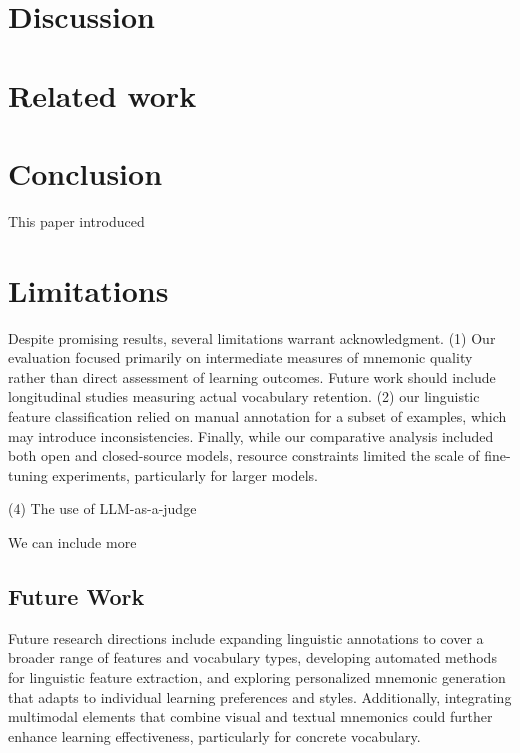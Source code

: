 \section{Discussion} \label{sec:discussion}


\section{Related work} \label{sec:related-work}


\section{Conclusion} \label{sec:conclusion}
This paper introduced

\section{Limitations} \label{sec:limitations}
Despite promising results, several limitations warrant acknowledgment. (1) Our evaluation focused primarily on intermediate measures of mnemonic quality rather than direct assessment of learning outcomes. Future work should include longitudinal studies measuring actual vocabulary retention. (2) our linguistic feature classification relied on manual annotation for a subset of examples, which may introduce inconsistencies. Finally, while our comparative analysis included both open and closed-source models, resource constraints limited the scale of fine-tuning experiments, particularly for larger models.

(4) The use of LLM-as-a-judge

We can include more

\subsection{Future Work} \label{sec:future-work}
Future research directions include expanding linguistic annotations to cover a broader range of features and vocabulary types, developing automated methods for linguistic feature extraction, and exploring personalized mnemonic generation that adapts to individual learning preferences and styles. Additionally, integrating multimodal elements that combine visual and textual mnemonics could further enhance learning effectiveness, particularly for concrete vocabulary.
